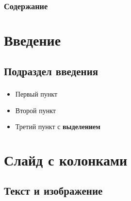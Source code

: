 \documentclass[aspectratio=169, t]{beamer}  %
\begin{document}
\frame[plain]{\titlepage}

\begin{frame}
    \frametitle{Содержание}
    \begin{multicols}{2}
    \tableofcontents
    \end{multicols}
\end{frame}

\section*{Введение} %
\subsection{Подраздел введения}

\begin{frame}
    \frametitle{\insertsection}
    \framesubtitle{\insertsubsection}
    
    \begin{itemize}
        \item Первый пункт
        \item Второй пункт
        \item Третий пункт с \textbf{выделением}
    \end{itemize}
    
\end{frame}

\section{Слайд с колонками}
\subsection{Текст и изображение}
\end{document}
